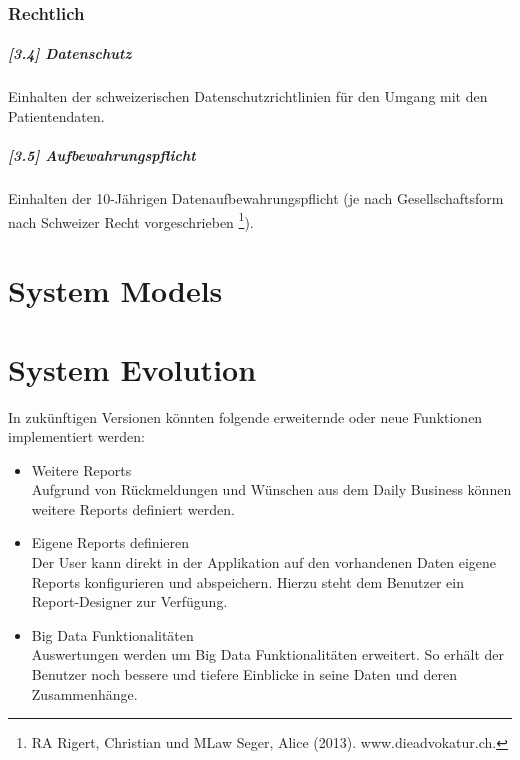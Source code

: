 \documentclass[a4paper]{scrreprt}
\begin{document}
\subsection{Rechtlich}
\paragraph{[3.4] Datenschutz} Einhalten der schweizerischen Datenschutzrichtlinien für den Umgang mit den Patientendaten.

\paragraph{[3.5] Aufbewahrungspflicht} Einhalten der 10-Jährigen Datenaufbewahrungspflicht (je nach Gesellschaftsform nach Schweizer Recht vorgeschrieben \footnote{RA Rigert, Christian und MLaw Seger, Alice (2013). www.dieadvokatur.ch.}).




\chapter{System Models}



\chapter{System Evolution}

In zukünftigen Versionen könnten folgende erweiternde oder neue Funktionen implementiert werden:
\begin{itemize}
\item Weitere Reports\\
Aufgrund von Rückmeldungen und Wünschen aus dem Daily Business können weitere Reports definiert werden.
\item Eigene Reports definieren\\
Der User kann direkt in der Applikation auf den vorhandenen Daten eigene Reports konfigurieren und abspeichern. Hierzu steht dem Benutzer ein Report-Designer zur Verfügung.
\item Big Data Funktionalitäten \\
Auswertungen werden um Big Data Funktionalitäten erweitert. So erhält der Benutzer noch bessere und tiefere Einblicke in seine Daten und deren Zusammenhänge.
\end{itemize}
\end{document}
